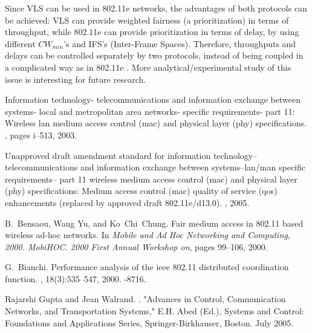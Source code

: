 \documentclass[letterpaper, 10 pt, conference]{ieeeconf}
\begin{document}
Since VLS can be used in 802.11e networks, the advantages of both 
protocols can be achieved: VLS can provide weighted fairness (a prioritization) in terms of throughput, while 802.11e can provide prioritization in terms of delay, by using different $CW_{min}$'s and IFS's (Inter-Frame Spaces). Therefore, throughputs and delays can be controlled separately by two protocols, instead of being coupled in a complicated way as in 802.11e \cite{Saturated_80211e}. More analytical/experimental study of this issue is interesting for future research.







\begin{thebibliography}{10}

Information technology- telecommunications and information exchange between
  systems- local and metropolitan area networks- specific requirements- part
  11: Wireless lan medium access control (mac) and physical layer (phy)
  specifications.
, pages i--513, 2003.

Unapproved draft amendment standard for information technology--
  telecommunications and information exchange between systems--lan/man specific
  requirements-- part 11 wireless medium access control (mac) and physical
  layer (phy) specifications: Medium access control (mac) quality of service
  (qos) enhancements (replaced by approved draft 802.11e/d13.0).
, 2005.

B.~Bensaou, Wang Yu, and Ko~Chi~Chung.
\newblock Fair medium access in 802.11 based wireless ad-hoc networks.
\newblock In {\em Mobile and Ad Hoc Networking and Computing, 2000. MobiHOC.
  2000 First Annual Workshop on}, pages 99--106, 2000.

G.~Bianchi.
\newblock Performance analysis of the ieee 802.11 distributed coordination
  function.
,
  18(3):535--547, 2000.
-8716.

Rajarshi Gupta and Jean Walrand.
.
\newblock "Advances in Control, Communication Networks, and Transportation
  Systems," E.H. Abed (Ed.), Systems and Control: Foundations and Applications
  Series, Springer-Birkhauser, Boston. July 2005.


\end{thebibliography}
\end{document}
